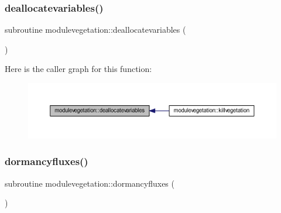 \subsubsection{\texorpdfstring{deallocatevariables()}{deallocatevariables()}}
{\footnotesize\ttfamily subroutine modulevegetation\+::deallocatevariables (\begin{DoxyParamCaption}{ }\end{DoxyParamCaption})\hspace{0.3cm}{\ttfamily [private]}}

Here is the caller graph for this function\+:\nopagebreak
\begin{figure}[H]
\begin{center}
\leavevmode
\includegraphics[width=350pt]{namespacemodulevegetation_a4208f430811c220efd414cd21312b73d_icgraph}
\end{center}
\end{figure}
\mbox{\label{namespacemodulevegetation_a62a594d5a2ef5f37a2dcbc4db8507793}} 
\subsubsection{\texorpdfstring{dormancyfluxes()}{dormancyfluxes()}}
{\footnotesize\ttfamily subroutine modulevegetation\+::dormancyfluxes (\begin{DoxyParamCaption}{ }\end{DoxyParamCaption})\hspace{0.3cm}{\ttfamily [private]}}

